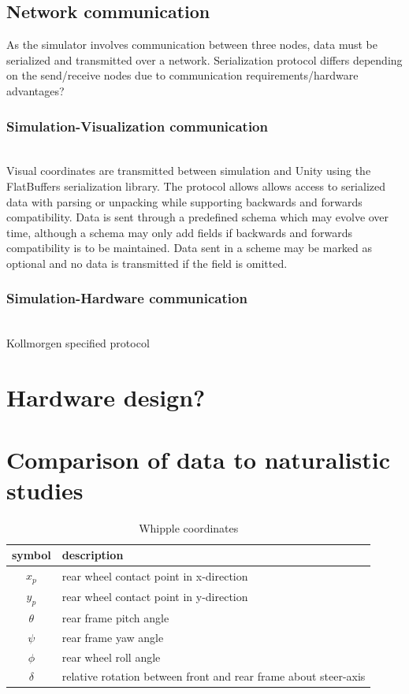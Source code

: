 \documentclass[11pt,a4paper,reqno]{amsart}
\newcommand{\x}{x_{p}}
\newcommand{\y}{y_{p}}
\newcommand{\pitch}{\theta}
\newcommand{\yaw}{\psi}
\newcommand{\roll}{\phi}
\newcommand{\steer}{\delta}
\begin{document}
\subsection{Network communication}
As the simulator involves communication between three nodes, data must be serialized and transmitted over a network.
Serialization protocol differs depending on the send/receive nodes due to communication requirements/hardware
advantages?
\subsubsection{Simulation-Visualization communication} \\
Visual coordinates are transmitted between simulation and Unity using the FlatBuffers serialization library.
The protocol allows allows access to serialized data with parsing or unpacking while supporting backwards and forwards
compatibility.
Data is sent through a predefined schema which may evolve over time, although a schema may only add fields if backwards
and forwards compatibility is to be maintained.
Data sent in a scheme may be marked as optional and no data is transmitted if the field is omitted.
\subsubsection{Simulation-Hardware communication} \\
Kollmorgen specified protocol

\section{Hardware design?}

\section{Comparison of data to naturalistic studies}

\begin{table}
    \centering
    \begin{tabular}{|c|l|}
        \hline
        symbol & description \\
        \hline
        $ \x $ & rear wheel contact point in x-direction \\
        $ \y $ & rear wheel contact point in y-direction \\
        $ \pitch $ & rear frame pitch angle \\
        $ \yaw $ & rear frame yaw angle \\
        $ \roll $ & rear wheel roll angle \\
        $ \steer $ & relative rotation between front and rear frame about steer-axis\\
        \hline
    \end{tabular}
    \caption{Whipple coordinates}
    \label{tab:coordinates}
\end{table}
\end{document}
